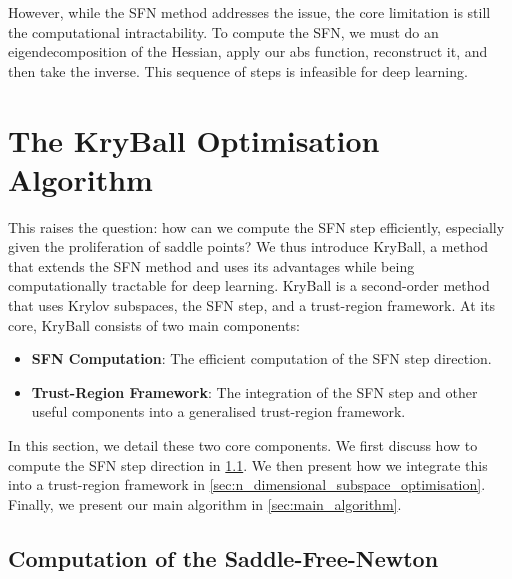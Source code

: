However, while the SFN method addresses the issue, the core limitation is still the computational intractability. To compute the SFN, we must do an eigendecomposition of the Hessian, apply our abs function, reconstruct it, and then take the inverse. This sequence of steps is infeasible for deep learning.  

\section{The KryBall Optimisation Algorithm}
\label{sec:kryball_optimisation_algorithm}
This raises the question: how can we compute the SFN step efficiently, especially given the proliferation of saddle points? We thus introduce KryBall, a method that extends the SFN method and uses its advantages while being computationally tractable for deep learning. KryBall is a second-order method that uses Krylov subspaces, the SFN step, and a trust-region framework. At its core, KryBall consists of two main components: 
\begin{itemize}
    \item \textbf{SFN Computation}: The efficient computation of the SFN step direction.
    \item \textbf{Trust-Region Framework}: The integration of the SFN step and other useful components into a generalised trust-region framework.
\end{itemize}
In this section, we detail these two core components. We first discuss how to compute the SFN step direction in \cref{sec:computation_of_the_saddle_free_newton}. We then present how we integrate this into a trust-region framework in \cref{sec:n_dimensional_subspace_optimisation}. Finally, we present our main algorithm in \cref{sec:main_algorithm}.

\subsection{Computation of the Saddle-Free-Newton}
\label{sec:computation_of_the_saddle_free_newton}

